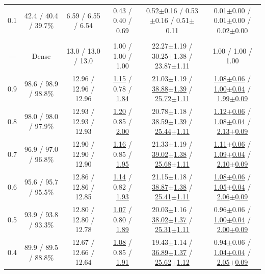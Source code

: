 \begin{table}[!t]
\begin{tabular}{cccccc}
0.1 & 42.4 / 40.4 / 39.7\% & 6.59 / 6.55 / 6.54 & 0.43 / 0.40 / 0.69 & 0.52{\scriptsize$\pm$0.16} / 0.53{\scriptsize$\pm$0.16} / 0.51{\scriptsize$\pm$0.11} & 0.01{\scriptsize$\pm$0.00} / 0.01{\scriptsize$\pm$0.00} / 0.02{\scriptsize$\pm$0.00} \\
\addlinespace[0.5pt]
\rowcolor{lightgray} \multicolumn{6}{c}{\rule{0pt}{2.2ex}\textbf{LLaMA-2-13B}\rule[-0.8ex]{0pt}{0pt}} \\
--- & Dense & 13.0 / 13.0 / 13.0 & 1.00 / 1.00 / 1.00 & 22.27{\scriptsize$\pm$1.19} / 30.25{\scriptsize$\pm$1.38} / 23.87{\scriptsize$\pm$1.11} & 1.00 / 1.00 / 1.00 \\
0.9 & 98.6 / 98.9 / 98.8\% & 12.96 / 12.96 / 12.96 & \underline{1.15} / 0.78 / \underline{1.84} & 21.03{\scriptsize$\pm$1.19} / \underline{38.88{\scriptsize$\pm$1.39}} / \underline{25.72{\scriptsize$\pm$1.11}} & \underline{1.08{\scriptsize$\pm$0.06}} / \underline{1.00{\scriptsize$\pm$0.04}} / \underline{1.99{\scriptsize$\pm$0.09}} \\
0.8 & 98.0 / 98.0 / 97.9\% & 12.93 / 12.93 / 12.93 & \underline{1.20} / 0.85 / \underline{2.00} & 20.78{\scriptsize$\pm$1.18} / \underline{38.59{\scriptsize$\pm$1.39}} / \underline{25.44{\scriptsize$\pm$1.11}} & \underline{1.12{\scriptsize$\pm$0.06}} / \underline{1.08{\scriptsize$\pm$0.04}} / \underline{2.13{\scriptsize$\pm$0.09}} \\
0.7 & 96.9 / 97.0 / 96.8\% & 12.90 / 12.90 / 12.90 & \underline{1.16} / 0.85 / \underline{1.95} & 21.33{\scriptsize$\pm$1.19} / \underline{39.02{\scriptsize$\pm$1.38}} / \underline{25.68{\scriptsize$\pm$1.11}} & \underline{1.11{\scriptsize$\pm$0.06}} / \underline{1.09{\scriptsize$\pm$0.04}} / \underline{2.10{\scriptsize$\pm$0.09}} \\
0.6 & 95.6 / 95.7 / 95.5\% & 12.86 / 12.86 / 12.85 & \underline{1.14} / 0.82 / \underline{1.93} & 21.15{\scriptsize$\pm$1.18} / \underline{38.87{\scriptsize$\pm$1.38}} / \underline{25.41{\scriptsize$\pm$1.11}} & \underline{1.08{\scriptsize$\pm$0.06}} / \underline{1.05{\scriptsize$\pm$0.04}} / \underline{2.06{\scriptsize$\pm$0.09}} \\
0.5 & 93.9 / 93.8 / 93.3\% & 12.80 / 12.80 / 12.78 & \underline{1.07} / 0.80 / \underline{1.89} & 20.03{\scriptsize$\pm$1.16} / \underline{38.02{\scriptsize$\pm$1.37}} / \underline{25.31{\scriptsize$\pm$1.11}} & 0.96{\scriptsize$\pm$0.06} / \underline{1.00{\scriptsize$\pm$0.04}} / \underline{2.00{\scriptsize$\pm$0.09}} \\
0.4 & 89.9 / 89.5 / 88.8\% & 12.67 / 12.66 / 12.64 & \underline{1.08} / 0.85 / \underline{1.91} & 19.43{\scriptsize$\pm$1.14} / \underline{36.89{\scriptsize$\pm$1.37}} / \underline{25.62{\scriptsize$\pm$1.12}} & 0.94{\scriptsize$\pm$0.06} / \underline{1.04{\scriptsize$\pm$0.04}} / \underline{2.05{\scriptsize$\pm$0.09}} \\

\end{tabular}
\end{table}
